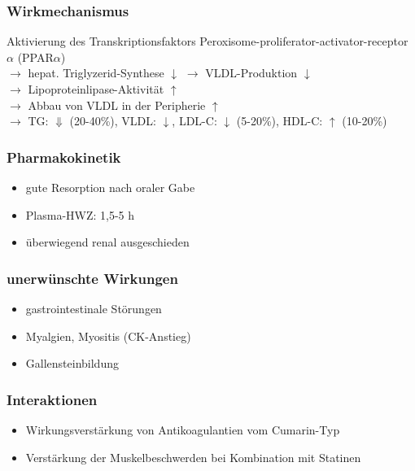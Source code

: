 \documentclass[10pt,a4paper]{report}
\begin{document}
\subsubsection{Wirkmechanismus} %
\label{par:wirkmechanismus}
Aktivierung des Transkriptionsfaktors 
Peroxisome-proliferator-activator-receptor $\alpha$ (PPAR$\alpha$)\\
$\rightarrow$ hepat. Triglyzerid-Synthese $\downarrow$ $\rightarrow$ VLDL-Produktion $\downarrow$\\
$\rightarrow$ Lipoproteinlipase-Aktivität $\uparrow$ \\
$\rightarrow$ Abbau von VLDL in der Peripherie $\uparrow$\\
$\rightarrow$ TG: $\Downarrow$ (20-40\%), VLDL: $\downarrow$, LDL-C: $\downarrow$ (5-20\%), HDL-C: $\uparrow$ (10-20\%)
\subsubsection{Pharmakokinetik} %
\label{par:pharmakokinetik}
\begin{itemize}
	\item gute Resorption nach oraler Gabe
	\item Plasma-HWZ: 1,5-5 h
	\item überwiegend renal ausgeschieden
\end{itemize}
\subsubsection{unerwünschte Wirkungen} %
\label{par:unerw_nschte_wirkungen}
\begin{itemize}
	\item gastrointestinale Störungen
	\item Myalgien, Myositis (CK-Anstieg)
	\item Gallensteinbildung
\end{itemize}
\subsubsection{Interaktionen} %
\label{par:interaktionen}
\begin{itemize}
	\item Wirkungsverstärkung von Antikoagulantien vom Cumarin-Typ
	\item Verstärkung der Muskelbeschwerden bei Kombination mit Statinen
\end{itemize}
\end{document}
